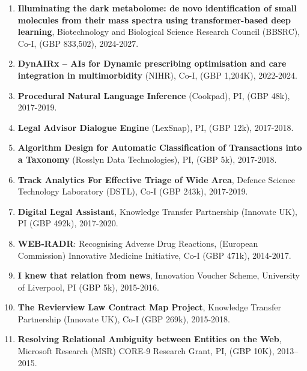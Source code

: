 \documentclass[a4paper,11pt]{article}
\begin{document}
\begin{enumerate}

\item \textbf{Illuminating the dark metabolome: de novo identification of small molecules from their mass spectra using transformer-based deep learning}, Biotechnology and Biological Science Research Council (BBSRC), Co-I, (GBP 833,502), 2024-2027.

\item \textbf{DynAIRx -- AIs for Dynamic prescribing optimisation and care integration in multimorbidity} (NIHR), Co-I, (GBP 1,204K), 2022-2024.

\item \textbf{Procedural Natural Language Inference} (Cookpad), PI, (GBP 48k), 2017-2019.

\item \textbf{Legal Advisor Dialogue Engine} (LexSnap), PI, (GBP 12k), 2017-2018.

\item \textbf{Algorithm Design for Automatic Classification of Transactions into a Taxonomy} (Rosslyn Data Technologies), PI, (GBP 5k), 2017-2018.


\item \textbf{Track Analytics For Effective Triage of Wide Area}, Defence Science Technology Laboratory (DSTL), Co-I (GBP 243k), 2017-2019.

\item \textbf{Digital Legal Assistant}, Knowledge Transfer Partnership (Innovate UK), PI (GBP 492k), 2017-2020.

\item \textbf{WEB-RADR}: Recognising Adverse Drug Reactions, (European Commission) Innovative Medicine Initiative, Co-I (GBP 471k), 2014-2017.

\item \textbf{I knew that relation from news}, Innovation Voucher Scheme, University of Liverpool, PI (GBP 5k), 2015-2016.

\item \textbf{The Revierview Law Contract Map Project}, Knowledge Transfer Partnership (Innovate UK), Co-I (GBP 269k), 2015-2018.

\item \textbf{Resolving Relational Ambiguity between Entities on the Web}, Microsoft Research (MSR) CORE-9 Research Grant, PI, (GBP 10K), 2013–2015.


\end{enumerate}
\end{document}
